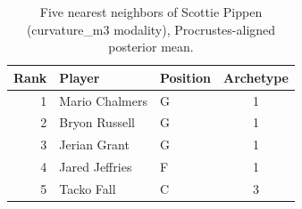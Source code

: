 \begin{table}[htbp]
  \centering\small
  \begin{tabular}{rllc}
    \toprule
    Rank & Player & Position & Archetype \\
    \midrule
    1 & Mario Chalmers & G & 1 \\
    2 & Bryon Russell & G & 1 \\
    3 & Jerian Grant & G & 1 \\
    4 & Jared Jeffries & F & 1 \\
    5 & Tacko Fall & C & 3 \\
    \bottomrule
  \end{tabular}
  \caption{Five nearest neighbors of Scottie Pippen (curvature_m3 modality), Procrustes-aligned posterior mean.}
  \label{tab:Scottie_Pippen_neighbors_curvature_m3}
\end{table}

